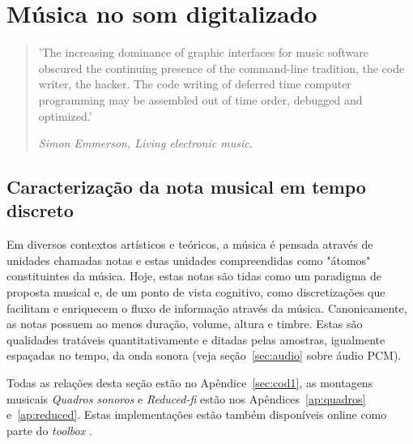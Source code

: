 \chapter{Música no som digitalizado} %
\label{cap:resultados} %
\begin{quotation}
\small
'The increasing dominance of graphic interfaces for music software obscured 
the continuing presence of the command-line tradition, 
the code writer, the hacker. The code writing of deferred time 
computer programming may be assembled out of time order, debugged and optimized.'

\emph{Simon Emmerson, Living electronic music.\cite{Emmerson}}
\end{quotation}


\section{Caracterização da nota musical em tempo discreto}\label{sec:notaDisc}
Em diversos contextos artísticos e teóricos, 
a música é pensada através de 
unidades chamadas notas e 
estas unidades compreendidas como "átomos" constituintes da música.\cite{Wisnick, Lovelock, Webern}
Hoje, estas notas
são tidas como um paradigma de proposta musical
e, de um ponto de vista cognitivo, como discretizações
que facilitam e enriquecem o fluxo de informação através da música.\cite{Roederer, Lacerda}
Canonicamente, as notas possuem ao menos duração, volume, altura e timbre.\cite{Lacerda} Estas
são qualidades tratáveis quantitativamente
e ditadas pelas amostras, igualmente espaçadas no tempo,
da onda sonora (veja seção~\ref{sec:audio} sobre áudio PCM).\cite{Roederer}

Todas as relações desta seção estão no Apêndice~\ref{sec:cod1}, as montagens musicais \emph{Quadros sonoros} e \emph{Reduced-fi} estão nos Apêndices~\ref{ap:quadros} e~\ref{ap:reduced}. Estas implementações estão também disponíveis online como parte do \emph{toolbox} \massa.\cite{MASSA}

